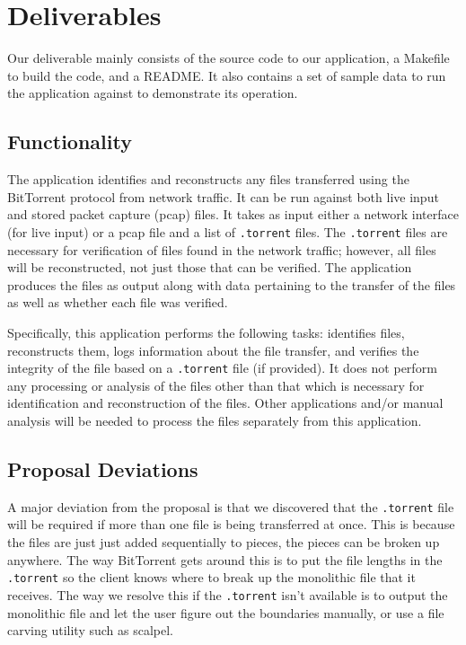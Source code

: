 \documentclass{acm_proc_article-sp}
\begin{document}
\section{Deliverables}
Our deliverable mainly consists of the source code to our application, a
Makefile to build the code, and a README. It also contains a set of sample data
to run the application against to demonstrate its operation.

\subsection{Functionality}
The application identifies and reconstructs any files transferred using the
BitTorrent protocol from network traffic. It can be run against both live input
and stored packet capture (pcap) files. It takes as input either a network
interface (for live input) or a pcap file and a list of \texttt{.torrent}
files. The \texttt{.torrent} files are necessary for verification of files found
in the network traffic; however, all files will be reconstructed, not just those
that can be verified. The application produces the files as output along with
data pertaining to the transfer of the files as well as whether each file was
verified.

Specifically, this application performs the following tasks: identifies files,
reconstructs them, logs information about the file transfer, and verifies the
integrity of the file based on a \texttt{.torrent} file (if provided). It does
not perform any processing or analysis of the files other than that which is
necessary for identification and reconstruction of the files. Other applications
and/or manual analysis will be needed to process the files separately from this
application.

\subsection{Proposal Deviations}
A major deviation from the proposal is that we discovered that the
\texttt{.torrent} file will be required if more than one file is being
transferred at once.  This is because the files are just just added
sequentially to pieces, the pieces can be broken up anywhere.  The way
BitTorrent gets around this is to put the file lengths in the \texttt{.torrent}
so the client knows where to break up the monolithic file that it receives.
The way we resolve this if the \texttt{.torrent} isn't available is to output
the monolithic file and let the user figure out the boundaries manually, or use
a file carving utility such as scalpel\cite{scalpel}.
\end{document}
